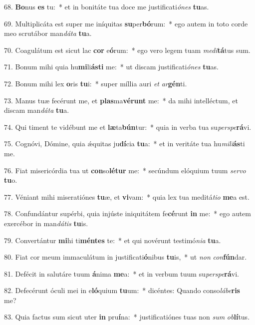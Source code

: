68. \textbf{Bo}nus \textbf{es} tu:~*  et in bonitáte tua doce me justificati\textit{ó}\textit{nes} \textbf{tu}as.\

69. Multiplicáta est super me iníquitas \textbf{su}per\textbf{bó}rum:~*  ego autem in toto corde meo scrutábor man\textit{dá}\textit{ta} \textbf{tu}a.\

70. Coagulátum est sicut lac \textbf{cor} e\textbf{ó}rum:~*  ego vero legem tuam \textit{me}\textit{di}\textbf{tá}tus sum.\

71. Bonum mihi quia hu\textbf{mi}li\textbf{ás}\textbf{ti} me:~*  ut discam justificati\textit{ó}\textit{nes} \textbf{tu}as.\

72. Bonum mihi lex \textbf{o}ris \textbf{tu}i:~*  super míllia auri \textit{et} \textit{ar}\textbf{gén}ti.\

73. Manus tuæ fecérunt me, et \textbf{plas}ma\textbf{vé}\textbf{runt} me:~*  da mihi intelléctum, et discam man\textit{dá}\textit{ta} \textbf{tu}a.\

74. Qui timent te vidébunt me et \textbf{læ}ta\textbf{bún}tur:~*  quia in verba tua su\textit{per}\textit{spe}\textbf{rá}vi.\

75. Cognóvi, Dómine, quia ǽquitas ju\textbf{dí}cia \textbf{tu}a:~*  et in veritáte tua hu\textit{mi}\textit{li}\textbf{ás}ti me.\

76. Fiat misericórdia tua ut \textbf{con}so\textbf{lé}\textbf{tur} me:~*  secúndum elóquium tuum \textit{ser}\textit{vo} \textbf{tu}o.\

77. Véniant mihi miseratiónes \textbf{tu}æ, et \textbf{vi}vam:~*  quia lex tua meditá\textit{ti}\textit{o} \textbf{me}a est.\

78. Confundántur supérbi, quia injúste iniquitátem fe\textbf{cé}runt \textbf{in} me:~*  ego autem exercébor in man\textit{dá}\textit{tis} \textbf{tu}is.\

79. Convertántur \textbf{mi}hi ti\textbf{mén}\textbf{tes} te:~*  et qui novérunt testimó\textit{ni}\textit{a} \textbf{tu}a.\

80. Fiat cor meum immaculátum in justificati\textbf{ó}nibus \textbf{tu}is,~*  ut \textit{non} \textit{con}\textbf{fún}dar.\

81. Defécit in salutáre tuum \textbf{á}nima \textbf{me}a:~*  et in verbum tuum su\textit{per}\textit{spe}\textbf{rá}vi.\

82. Defecérunt óculi mei in e\textbf{ló}quium \textbf{tu}um:~*  dicéntes: Quando conso\textit{lá}\textit{be}\textbf{ris} me?\

83. Quia factus sum sicut uter \textbf{in} pru\textbf{í}na:~*  justificatiónes tuas non \textit{sum} \textit{ob}\textbf{lí}tus.\


